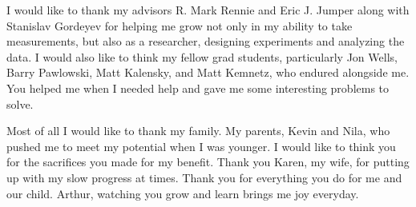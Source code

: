 \begin{acknowledge}
I would like to thank my advisors R. Mark Rennie and Eric J. Jumper along with Stanislav Gordeyev for helping me grow not only in my ability to take measurements, but also as a researcher, designing experiments and analyzing the data.
I would also like to think my fellow grad students, particularly Jon Wells, Barry Pawlowski, Matt Kalensky, and Matt Kemnetz, who endured alongside me.
You helped me when I needed help and gave me some interesting problems to solve.

Most of all I would like to thank my family.
My parents, Kevin and Nila, who pushed me to meet my potential when I was younger.
I would like to think you for the sacrifices you made for my benefit.
Thank you Karen, my wife, for putting up with my slow progress at times.
Thank you for everything you do for me and our child.
Arthur, watching you grow and learn brings me joy everyday.
\end{acknowledge}

